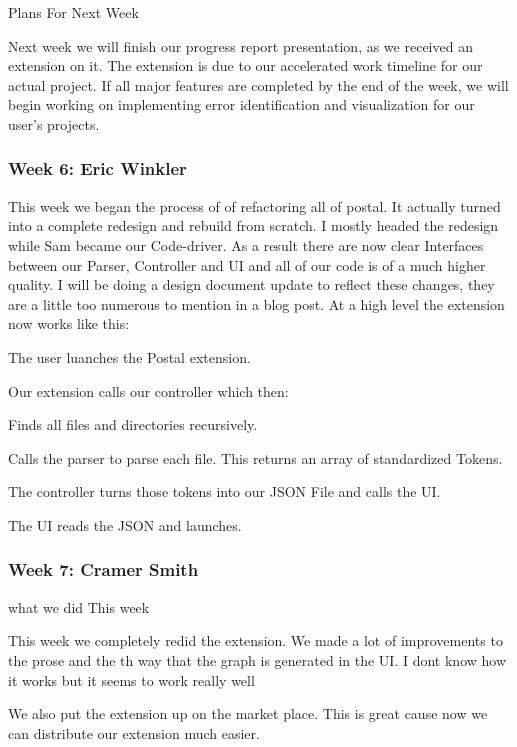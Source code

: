 Plans For Next Week

Next week we will finish our progress report presentation, as we received an extension on it. The extension is due to our accelerated work timeline for our actual project. If all major features are completed by the end of the week, we will begin working on implementing error identification and visualization for our user's projects. \\ 

 \subsubsection{Week 6: Eric Winkler}

This week we began the process of of refactoring all of postal. It actually turned into a complete redesign and rebuild from scratch. I mostly headed the redesign while Sam became our Code-driver. As a result there are now clear Interfaces between our Parser, Controller and UI and all of our code is of a much higher quality. I will be doing a design document update to reflect these changes, they are a little too numerous to mention in a blog post. At a high level the extension now works like this:

The user luanches the Postal extension.

Our extension calls our controller which then:

   Finds all files and directories recursively.

   Calls the parser to parse each file. This returns an array of standardized Tokens.

   The controller turns those tokens into our JSON File and calls the UI.

   The UI reads the JSON and launches. \\ 

 

 \subsubsection{Week 7: Cramer Smith}

what we did This week 



This week we completely redid the extension. We made a lot of improvements to the prose and the th way that the graph is generated in the UI. I dont know how it works but it seems to work really well

We also put the extension up on the market place. This is great cause now we can distribute our extension much easier.



